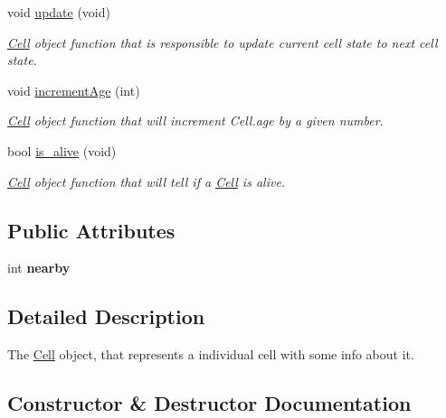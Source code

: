 \begin{DoxyCompactItemize}
\mbox{\label{class_cell_abb40b623b840bc0c25e2808b695bc806}} 
void \mbox{\hyperlink{class_cell_abb40b623b840bc0c25e2808b695bc806}{update}} (void)
\begin{DoxyCompactList}\small\item\em \mbox{\hyperlink{class_cell}{Cell}} object function that is responsible to update current cell state to next cell state. \end{DoxyCompactList}\item 
void \mbox{\hyperlink{class_cell_a289682e9815c9e72f85ee21153688d3f}{increment\+Age}} (int)
\begin{DoxyCompactList}\small\item\em \mbox{\hyperlink{class_cell}{Cell}} object function that will increment Cell.\+age by a given number. \end{DoxyCompactList}\item 
\mbox{\label{class_cell_ab947cadfe0d070018a611604aa5a73ed}} 
bool \mbox{\hyperlink{class_cell_ab947cadfe0d070018a611604aa5a73ed}{is\+\_\+alive}} (void)
\begin{DoxyCompactList}\small\item\em \mbox{\hyperlink{class_cell}{Cell}} object function that will tell if a \mbox{\hyperlink{class_cell}{Cell}} is alive. \end{DoxyCompactList}\end{DoxyCompactItemize}
\subsection*{Public Attributes}
\begin{DoxyCompactItemize}
\item 
\mbox{\label{class_cell_a10947693e237e1cd547fd3cc8eea7501}} 
int {\bfseries nearby}
\end{DoxyCompactItemize}


\subsection{Detailed Description}
The \mbox{\hyperlink{class_cell}{Cell}} object, that represents a individual cell with some info about it. 

\subsection{Constructor \& Destructor Documentation}
\mbox{\label{class_cell_a7bd32ff9f08a21330169bb4d8cf09a46}} 
